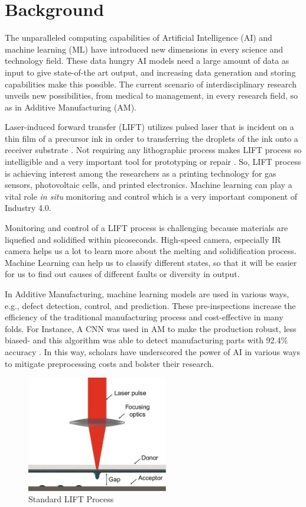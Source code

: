 \documentclass[letterpaper]{article}
\begin{document}
\section*{Background}
The unparalleled computing capabilities of Artificial Intelligence (AI) and machine learning (ML) have introduced new dimensions in every science and technology field. These data hungry AI models need a large amount of data as input to give state-of-the art output, and increasing data generation and storing capabilities make this possible. The current scenario of interdisciplinary research unveils new possibilities, from medical to management, in every research field, so as in Additive Manufacturing (AM).
\par
Laser-induced forward transfer (LIFT) utilizes pulsed laser that is incident on a thin film of a precursor ink in order to transferring the droplets of the ink onto a receiver substrate \parencite[]{pradas}. Not requiring any lithographic process makes LIFT process so intelligible and a very important tool for prototyping or repair \parencite[]{arnold}. So, LIFT process is achieving interest among the researchers as a printing technology for gas sensors, photovoltaic cells, and printed electronics. Machine learning can play a vital role \textit{in situ} monitoring and control which is a very important component of Industry 4.0.
\par
Monitoring and control of a LIFT process is challenging because materials are liquefied and solidified within picoseconds. High-speed camera, especially IR camera helps us a lot to learn more about the melting and solidification process. Machine Learning can help us to classify different states, so that it will be easier for us to find out causes of different faults or diversity in output.
\par
In Additive Manufacturing, machine learning models are used in various ways, e.g., defect detection, control, and prediction. These pre-inspections increase the efficiency of the traditional manufacturing process and cost-effective in many folds. For Instance, A CNN was used in AM to make the production robust, less biased- and this algorithm was able to detect manufacturing parts with 92.4\% accuracy \parencite[]{cui}. In this way, scholars have underscored the power of AI in various ways to mitigate preprocessing costs and bolster their research.
\par
\begin{figure}[h!]
  \centering
  \includegraphics[width=175pt]{images/fig1.jpg}
  \caption{Standard LIFT Process \parencite[]{morales}}
  \label{fig:stdlift}
\end{figure}
\end{document}
